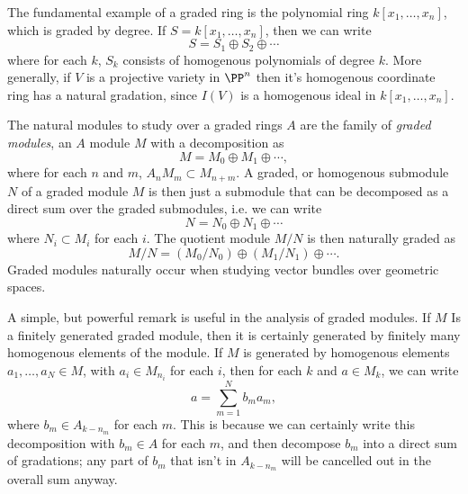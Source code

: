 \begin{example}
    The fundamental example of a graded ring is the polynomial ring $k[x_1, \dots, x_n]$, which is graded by degree. If $S = k[x_1,\dots,x_n]$, then we can write
    \[ S = S_1 \oplus S_2 \oplus \cdots \]
    where for each $k$, $S_k$ consists of homogenous polynomials of degree $k$. More generally, if $V$ is a projective variety in $\PP^n$ then it's homogenous coordinate ring has a natural gradation, since $I(V)$ is a homogenous ideal in $k[x_1,\dots,x_n]$.
\end{example}

The natural modules to study over a graded rings $A$ are the family of \emph{graded modules}, an $A$ module $M$ with a decomposition as
%
\[ M = M_0 \oplus M_1 \oplus \cdots, \]
%
where for each $n$ and $m$, $A_n M_m \subset M_{n+m}$. A graded, or homogenous submodule $N$ of a graded module $M$ is then just a submodule that can be decomposed as a direct sum over the graded submodules, i.e. we can write
%
\[ N = N_0 \oplus N_1 \oplus \cdots \]
%
where $N_i \subset M_i$ for each $i$. The quotient module $M/N$ is then naturally graded as
%
\[ M/N = (M_0/N_0) \oplus (M_1/N_1) \oplus \cdots. \]
%
Graded modules naturally occur when studying vector bundles over geometric spaces.

A simple, but powerful remark is useful in the analysis of graded modules. If $M$ Is a finitely generated graded module, then it is certainly generated by finitely many homogenous elements of the module. If $M$ is generated by homogenous elements $a_1, \dots, a_N \in M$, with $a_i \in M_{n_i}$ for each $i$, then for each $k$ and $a \in M_k$, we can write
%
\[ a = \sum_{m = 1}^N b_m a_m, \]
%
where $b_m \in A_{k - n_m}$ for each $m$. This is because we can certainly write this decomposition with $b_m \in A$ for each $m$, and then decompose $b_m$ into a direct sum of gradations; any part of $b_m$ that isn't in $A_{k-n_m}$ will be cancelled out in the overall sum anyway.

